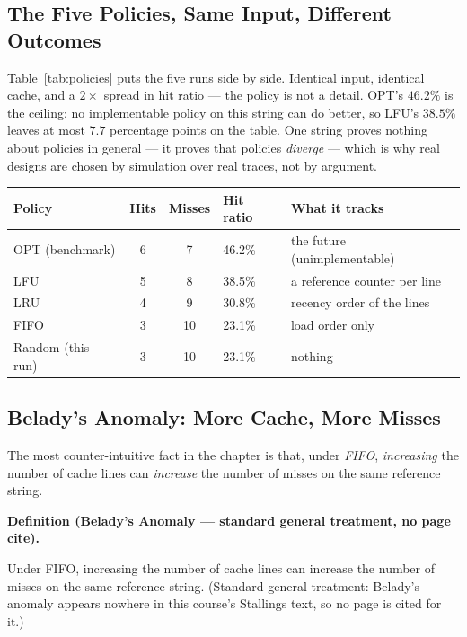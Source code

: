 \documentclass[11pt]{article}
\newenvironment{definitionbox}[1]{%
  \par\noindent\textbf{Definition (#1).}\ \itshape
}{\par\vspace{0.3em}}
\begin{document}
\subsection{The Five Policies, Same Input, Different Outcomes}

Table~\ref{tab:policies} puts the five runs side by side. Identical input, identical cache, and a $2\times$ spread in hit ratio --- the policy is not a detail. OPT's $46.2\%$ is the ceiling: no implementable policy on this string can do better, so LFU's $38.5\%$ leaves at most $7.7$ percentage points on the table. One string proves nothing about policies in general --- it proves that policies \emph{diverge} --- which is why real designs are chosen by simulation over real traces, not by argument.

\begin{center}
\footnotesize
\begin{tabular}{@{}lccll@{}}
  \toprule
  \textbf{Policy} & \textbf{Hits} & \textbf{Misses} & \textbf{Hit ratio} & \textbf{What it tracks} \\
  \midrule
  OPT (benchmark)     & 6 & 7  & 46.2\% & the future (unimplementable) \\
  LFU                 & 5 & 8  & 38.5\% & a reference counter per line \\
  LRU                 & 4 & 9  & 30.8\% & recency order of the lines \\
  FIFO                & 3 & 10 & 23.1\% & load order only \\
  Random (this run)   & 3 & 10 & 23.1\% & nothing \\
  \bottomrule
\end{tabular}
\label{tab:policies}
\end{center}

\subsection{Belady's Anomaly: More Cache, More Misses}

The most counter-intuitive fact in the chapter is that, under \emph{FIFO}, \emph{increasing} the number of cache lines can \emph{increase} the number of misses on the same reference string.

\begin{definitionbox}{Belady's Anomaly --- standard general treatment, no page cite}
Under FIFO, increasing the number of cache lines can increase the number of misses on the same reference string. (Standard general treatment: Belady's anomaly appears nowhere in this course's Stallings text, so no page is cited for it.)
\end{definitionbox}
\end{document}

